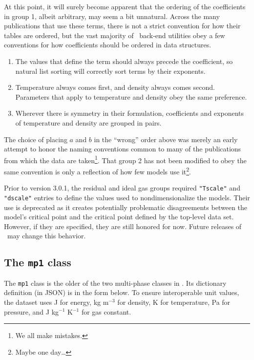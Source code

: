 At this point, it will surely become apparent that the ordering of the coefficients in group 1, albeit arbitrary, may seem a bit unnatural.  Across the many publications that use these terms, there is not a strict convention for how their tables are ordered, but the vast majority of \PM\ back-end utilities obey a few conventions for how coefficients should be ordered in data structures.
\begin{enumerate}
\item The values that define the term should always precede the coefficient, so natural list sorting will correctly sort terms by their exponents.
\item Temperature always comes first, and density always comes second.  Parameters that apply to temperature and density obey the same preference.
\item Wherever there is symmetry in their formulation, coefficients and exponents of temperature and density are grouped in pairs.
\end{enumerate}  
The choice of placing $a$ and $b$ in the ``wrong'' order above was merely an early attempt to honor the naming conventions common to many of the publications from which the data are taken\footnote{We all make mistakes.}.  That group 2 has not been modified to obey the same convention is only a reflection of how few models use it\footnote{Maybe one day\ldots}.

Prior to version 3.0.1, the residual and ideal gas groups required \texttt{"Tscale"} and \texttt{"dscale"} entries to define the values used to nondimensionalize the models.  Their use is deprecated as it creates potentially problematic disagreements between the model's critical point and the critical point defined by the top-level data set.  However, if they are specified, they are still honored for now.  Future releases of \PM\ may change this behavior.

\subsection{The \texttt{mp1} class}

The \texttt{mp1} class is the older of the two multi-phase classes in \PM.  Its dictionary definition (in JSON) is in the form below.  To ensure interoperable unit values, the dataset uses J for energy, kg m$^{-3}$ for density, K for temperature, Pa for pressure, and J kg$^{-1}$ K$^{-1}$ for gas constant.

